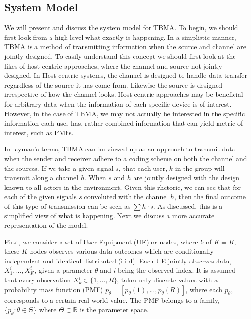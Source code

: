 \documentclass{article}
\begin{document}
\subsection{System Model}\label{sys_mod}
We will present and discuss the system model for TBMA. To begin, we should first look from a high level what exactly is happening. In a simplistic manner, TBMA is a method of transmitting information when the source and channel are jointly designed. To easily understand this concept we should first look at the likes of host-centric approaches, where the channel and source not jointly designed. In Host-centric systems, the channel is designed to handle data transfer regardless of the source it has come from. Likewise the source is designed irrespective of how the channel looks. Host-centric approaches may be beneficial for arbitrary data when the information of each specific device is of interest. However, in the case of TBMA, we may not actually be interested in the specific information each user has, rather combined information that can yield metric of interest, such as PMFs. 

In layman's terms, TBMA can be viewed up as an approach to transmit data when the sender and receiver adhere to a coding scheme on both the channel and the sources. If we take a given signal $s$, that each user, $k$ in the group will transmit along a channel $h$. When $s$ and $h$ are jointly designed with the design known to all actors in the environment. Given this rhetoric, we can see that for each of the given signals $s$ convoluted with the channel $h$, then the final outcome of this type of transmission can be seen as $\sum h \cdot s$. As discussed, this is a simplified view of what is happening. Next we discuss a more accurate representation of the model. 


First, we  consider a set of User Equipment (UE) or nodes, where ${k}$ of ${K} = K$, these $K$ nodes observes various data outcomes which are conditionally independent and identical distributed (i.i.d). Each UE jointly observes data, $X^i_1, \ldots, X^i_K$, given a parameter $\theta$ and $i$ being the observed index. It is assumed that every observation  ${X^i_k \in \{1, \ldots, R\}}$, takes only discrete values with a probability mass function (PMF) ${p_{\theta} = [p_{\theta}(1), \ldots, p_{\theta}(R)]}$, where each $p_{\theta}$, corresponds to a certain real world value. The PMF belongs to a family, $\{p_{\theta}: \theta \in \Theta\}$ where $\Theta \subset \mathbb{R}$ is the parameter space.
\end{document}
